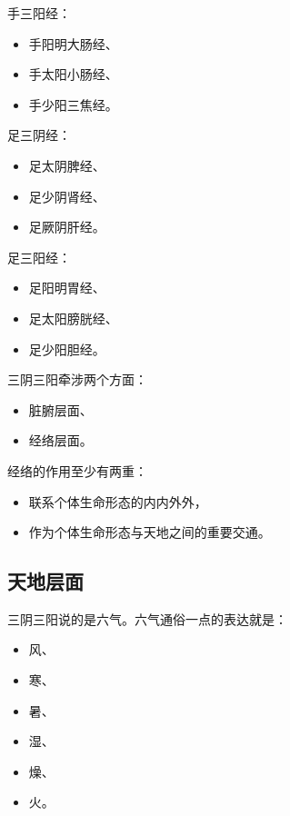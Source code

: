 \documentclass[
]{book}
\providecommand{\tightlist}{%
  \setlength{\itemsep}{0pt}\setlength{\parskip}{0pt}}
\begin{document}
手三阳经：

\begin{itemize}
\tightlist
\item
  手阳明大肠经、
\item
  手太阳小肠经、
\item
  手少阳三焦经。
\end{itemize}

足三阴经：

\begin{itemize}
\tightlist
\item
  足太阴脾经、
\item
  足少阴肾经、
\item
  足厥阴肝经。
\end{itemize}

足三阳经：

\begin{itemize}
\tightlist
\item
  足阳明胃经、
\item
  足太阳膀胱经、
\item
  足少阳胆经。
\end{itemize}

三阴三阳牵涉两个方面：

\begin{itemize}
\tightlist
\item
  脏腑层面、
\item
  经络层面。
\end{itemize}

经络的作用至少有两重：

\begin{itemize}
\tightlist
\item
  联系个体生命形态的内内外外，
\item
  作为个体生命形态与天地之间的重要交通。
\end{itemize}

\subsection{天地层面}\label{ux5929ux5730ux5c42ux9762}

三阴三阳说的是六气。六气通俗一点的表达就是：

\begin{itemize}
\tightlist
\item
  风、
\item
  寒、
\item
  暑、
\item
  湿、
\item
  燥、
\item
  火。
\end{itemize}
\end{document}
